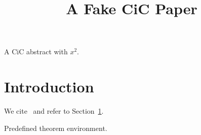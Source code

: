 \documentclass[version=preprint]{iacrcc}
\title[running = {Fake CiC}, subtitle = {A subtitle}]{A Fake CiC Paper}
\begin{document}
\maketitle
{}
\begin{textabstract}
A CiC abstract with $x^2$.
\end{textabstract}
\section{Introduction}\label{sec:intro}
We cite~\cite{CicA} and refer to Section~\ref{sec:intro}.
\begin{theorem}\label{thm:c}
Predefined theorem environment.
\end{theorem}

\end{document}
